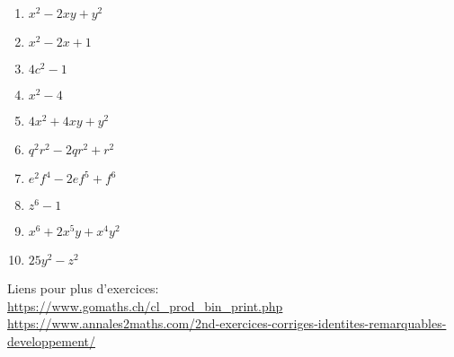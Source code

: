 \documentclass[a4paper,11pt]{article}
\begin{document}
\begin{solution}
\begin{enumerate}
\item $x^2-2xy+y^2$
\item $x^2-2x+1$
\item $4c^2-1$
\item $x^2-4$
\item $4x^2+4xy+y^2$
\item $q^2r^2-2qr^2+r^2$
\item $e^2f^4-2ef^5+f^6$
\item $z^6-1$
\item $x^6+2x^5y+x^4y^2$
\item $25y^2-z^2$
\end{enumerate}
\end{solution}

Liens pour plus d'exercices:\\
\url{https://www.gomaths.ch/cl_prod_bin_print.php}
\url{https://www.annales2maths.com/2nd-exercices-corriges-identites-remarquables-developpement/}
\end{document}
